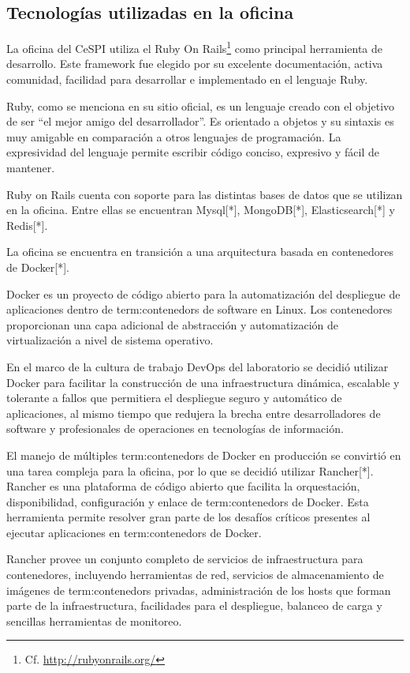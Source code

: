 \subsection{Tecnologías utilizadas en la oficina}
\label{tecnologias_utilizadas}

La oficina del CeSPI utiliza el   Ruby On
Rails\footnote{Cf.  \url{http://rubyonrails.org/}} como principal herramienta
de desarrollo. Este framework fue elegido por su excelente documentación,
activa comunidad, facilidad para desarrollar e implementado en el lenguaje
Ruby.

Ruby, como se menciona en su sitio oficial, es un lenguaje creado con el
objetivo de ser “el mejor amigo del desarrollador”. Es orientado a objetos y su
sintaxis es muy amigable en comparación a otros lenguajes de programación. La
expresividad del lenguaje permite escribir código conciso, expresivo y fácil de
mantener.

Ruby on Rails cuenta con soporte para las distintas bases de datos que se
utilizan en la oficina. Entre ellas se encuentran Mysql[*], MongoDB[*],
Elasticsearch[*] y Redis[*].

La oficina se encuentra en transición a una arquitectura basada en contenedores
de Docker[*].

Docker es un proyecto de código abierto para la automatización del despliegue
de aplicaciones dentro de \glspl{term:contenedor} de software en Linux. Los contenedores
proporcionan una capa adicional de abstracción y automatización de
virtualización a nivel de sistema operativo.

En el marco de la cultura de trabajo DevOps del laboratorio se decidió utilizar
Docker para facilitar la construcción de una infraestructura dinámica,
escalable y tolerante a fallos que permitiera el despliegue seguro y automático
de aplicaciones, al mismo tiempo que redujera la brecha entre desarrolladores
de software y profesionales de operaciones en tecnologías de información.

El manejo de múltiples \glspl{term:contenedor} de Docker en producción se convirtió en una
tarea compleja para la oficina, por lo que se decidió utilizar Rancher[*].
Rancher es una plataforma de código abierto que facilita la orquestación,
disponibilidad, configuración y enlace de \glspl{term:contenedor} de Docker. Esta
herramienta permite resolver gran parte de los desafíos críticos presentes al
ejecutar aplicaciones en \glspl{term:contenedor} de Docker.

Rancher provee un conjunto completo de servicios de infraestructura para
contenedores, incluyendo herramientas de red, servicios de almacenamiento de
imágenes de \glspl{term:contenedor} privadas, administración de los hosts que forman parte
de la infraestructura, facilidades para el despliegue, balanceo de carga y
sencillas herramientas de monitoreo.

